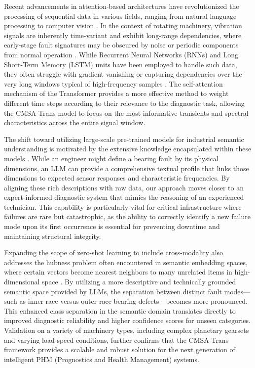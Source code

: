 \documentclass[journal]{IEEEtran}
\begin{document}
Recent advancements in attention-based architectures have revolutionized the processing of sequential data in various fields, ranging from natural language processing to computer vision \cite{devlin2018bert, dosovitskiy2020image}. In the context of rotating machinery, vibration signals are inherently time-variant and exhibit long-range dependencies, where early-stage fault signatures may be obscured by noise or periodic components from normal operation \cite{zhang2021attention}. While Recurrent Neural Networks (RNNs) and Long Short-Term Memory (LSTM) units have been employed to handle such data, they often struggle with gradient vanishing or capturing dependencies over the very long windows typical of high-frequency samples \cite{hochreiter1997long}. The self-attention mechanism of the Transformer provides a more effective method to weight different time steps according to their relevance to the diagnostic task, allowing the CMSA-Trans model to focus on the most informative transients and spectral characteristics across the entire signal window.

The shift toward utilizing large-scale pre-trained models for industrial semantic understanding is motivated by the extensive knowledge encapsulated within these models \cite{zhao2023brain}. While an engineer might define a bearing fault by its physical dimensions, an LLM can provide a comprehensive textual profile that links those dimensions to expected sensor responses and characteristic frequencies. By aligning these rich descriptions with raw data, our approach moves closer to an expert-informed diagnostic system that mimics the reasoning of an experienced technician. This capability is particularly vital for critical infrastructure where failures are rare but catastrophic, as the ability to correctly identify a new failure mode upon its first occurrence is essential for preventing downtime and maintaining structural integrity.

Expanding the scope of zero-shot learning to include cross-modality also addresses the hubness problem often encountered in semantic embedding spaces, where certain vectors become nearest neighbors to many unrelated items in high-dimensional space \cite{radovanovic2010hubs}. By utilizing a more descriptive and technically grounded semantic space provided by LLMs, the separation between distinct fault modes---such as inner-race versus outer-race bearing defects---becomes more pronounced. This enhanced class separation in the semantic domain translates directly to improved diagnostic reliability and higher confidence scores for unseen categories. Validation on a variety of machinery types, including complex planetary gearsets and varying load-speed conditions, further confirms that the CMSA-Trans framework provides a scalable and robust solution for the next generation of intelligent PHM (Prognostics and Health Management) systems.
\end{document}
